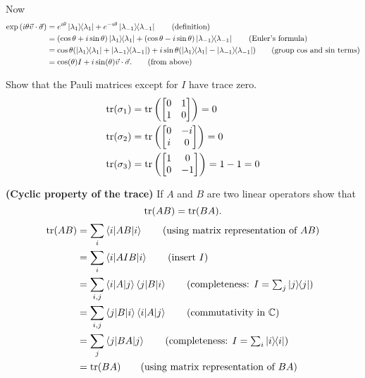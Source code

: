 Now
\begin{align*}
	\exp \left(i \theta \vec{v} \cdot \vec{\sigma} \right) &=
	e^{i \theta} \kb{\lambda_1}  + e^{-i \theta} \kb{\lambda_{-1}} \tag{definition}\\
	&= (\cos \theta + i \sin \theta) \kb{\lambda_1} + (\cos \theta - i \sin \theta) \kb{\lambda_{-1}} \tag{Euler's formula}\\
	&= \cos \theta (\kb{\lambda_1} + \kb{\lambda_{-1}}) + i \sin \theta (\kb{\lambda_1} - \kb{\lambda_{-1}}) \tag{group $\cos$ and $\sin$ terms}\\
	&= \cos( \theta) I + i \sin (\theta) \vec{v} \cdot \vec{\sigma}. \tag{from above}
\end{align*}

 Show that the Pauli matrices except for $I$ have trace zero.
\Soln
\begin{align*}
	\Tr (\sigma_1) &= \Tr \left(
		\begin{bmatrix}
		0 & 1 \\
		1 & 0
		\end{bmatrix}
	\right) = 0\\
%
	\Tr (\sigma_2) &= \Tr \left(
		\begin{bmatrix}
		0 & -i \\
		i & 0
		\end{bmatrix}
	\right) = 0\\
%
	\Tr (\sigma_3) &= \Tr \left(
	\begin{bmatrix}
		1 & 0 \\
		0 & -1
	\end{bmatrix}
	\right) = 1 -1 = 0\\
\end{align*}

 \textbf{(Cyclic property of the trace)} If $A$ and $B$ are two linear operators show that $$\operatorname{tr}(AB)=\operatorname{tr}(BA).$$
\begin{align*}
	\Tr (AB) &= \sum_i \braket{i | AB | i} \tag{using matrix representation of $AB$}\\
		&=\sum_i \braket{i | A I B | i} \tag{insert $I$}\\
		&= \sum_{i,j} \braket{i | A | j}\braket{j | B | i} \tag{completeness: $I=\sum_j\kb{j}$}\\
		&= \sum_{i,j} \braket{j | B | i} \braket{i | A | j} \tag{commutativity in $\mathbb{C}$}\\
		&= \sum_j \braket{j | BA | j} \tag{completeness: $I=\sum_i\kb{i}$}\\
		&= \Tr (BA) \tag{using matrix representation of $BA$}
\end{align*}



